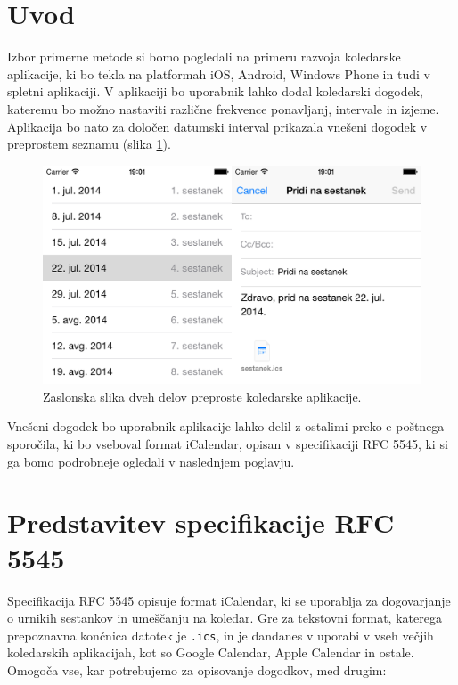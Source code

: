 \section{Uvod}

Izbor primerne metode si bomo pogledali na primeru razvoja koledarske aplikacije, ki bo tekla na platformah iOS, Android, Windows Phone in tudi v spletni aplikaciji. V aplikaciji bo uporabnik lahko dodal koledarski dogodek, kateremu bo možno nastaviti različne frekvence ponavljanj, intervale in izjeme. Aplikacija bo nato za določen datumski interval prikazala vnešeni dogodek v preprostem seznamu (slika \ref{fig:app-ios}).

\begin{figure}
 \includegraphics[width=\linewidth]{app-ios}
 \caption{Zaslonska slika dveh delov preproste koledarske aplikacije.}
 \label{fig:app-ios}
\end{figure}

Vnešeni dogodek bo uporabnik aplikacije lahko delil z ostalimi preko e-poštnega sporočila, ki bo vseboval format iCalendar, opisan v specifikaciji RFC 5545\cite{rfc5545}, ki si ga bomo podrobneje ogledali v naslednjem poglavju.

\section{Predstavitev specifikacije RFC 5545}

Specifikacija RFC 5545\cite{rfc5545} opisuje format iCalendar, ki se uporablja za dogovarjanje o urnikih sestankov in umeščanju na koledar. Gre za tekstovni format, katerega prepoznavna končnica datotek je \texttt{.ics}, in je dandanes v uporabi v vseh večjih koledarskih aplikacijah, kot so Google Calendar, Apple Calendar in ostale. Omogoča vse, kar potrebujemo za opisovanje dogodkov, med drugim:

